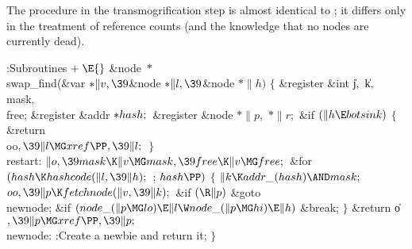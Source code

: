 The  procedure in the
transmogrification step is
almost identical to ; it differs only in the treatment
of reference counts (and the knowledge that no nodes are currently dead).

\Y\B\4:Subroutines\X${}\mathrel+\E{}$\6
\&{node} ${}{*}{}$\\{swap\_find}(\&{var} ${}{*}\|v,\39{}$\&{node} ${}{*}\|l,%
\39{}$\&{node} ${}{*}\|h){}$\1\1\2\2\6
${}\{{}$\1\6
\&{register} \&{int} \|j${},{}$ \|k${},{}$ \\{mask}${},{}$ \\{free};\6
\&{register} \&{addr} ${}{*}\\{hash};{}$\6
\&{register} \&{node} ${}{*}\|p,{}$ ${}{*}\|r;{}$\7
\&{if} ${}(\|h\E\\{botsink}){}$\5
${}\{{}$\1\6
\&{return} \\{oo}${},\39\|l\MG\\{xref}\PP,\39\|l;{}$\6
\4${}\}{}$\2\6
\4\\{restart}:\5
${}\|o,\39\\{mask}\K\|v\MG\\{mask},\39\\{free}\K\|v\MG\\{free};{}$\6
\&{for} ${}(\\{hash}\K\\{hashcode}(\|l,\39\|h);{}$  ; ${}\\{hash}\PP){}$\5
${}\{{}$\1\6
${}\|k\K\\{addr\_}(\\{hash})\AND\\{mask};{}$\6
${}\\{oo},\39\|p\K\\{fetchnode}(\|v,\39\|k);{}$\6
\&{if} ${}(\R\|p){}$\1\5
\&{goto} \\{newnode};\2\6
\&{if} ${}(\\{node\_}(\|p\MG\\{lo})\E\|l\W\\{node\_}(\|p\MG\\{hi})\E\|h){}$\1\5
\&{break};\2\6
\4${}\}{}$\2\6
\&{return} \|o${},\39\|p\MG\\{xref}\PP,\39\|p;{}$\6
\4\\{newnode}:\5
:Create a newbie and return it\X;\6
\4${}\}{}$\2\par
\fi

